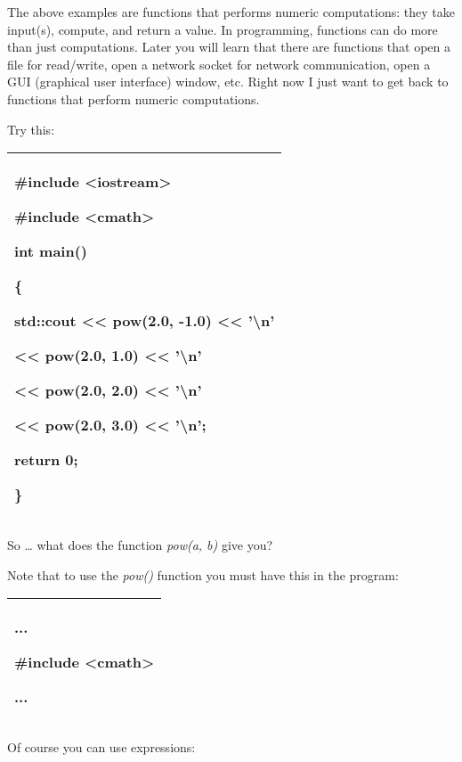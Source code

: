 \documentclass[
]{article}
\begin{document}
The above examples are functions that performs numeric computations:
they take input(s), compute, and return a value. In programming,
functions can do more than just computations. Later you will learn that
there are functions that open a file for read/write, open a network
socket for network communication, open a GUI (graphical user interface)
window, etc. Right now I just want to get back to functions that perform
numeric computations.

Try this:

\begin{longtable}[]{@{}l@{}}
\toprule
\endhead
\begin{minipage}[t]{0.97\columnwidth}\raggedright
\#include \textless iostream\textgreater{}

\#include \textless cmath\textgreater{}

int main()

\{

std::cout \textless\textless{} pow(2.0, -1.0) \textless\textless{}
'\textbackslash n'

\textless\textless{} pow(2.0, 1.0) \textless\textless{}
'\textbackslash n'

\textless\textless{} pow(2.0, 2.0) \textless\textless{}
'\textbackslash n'

\textless\textless{} pow(2.0, 3.0) \textless\textless{}
'\textbackslash n';

return 0;

\}\strut
\end{minipage}\tabularnewline
\bottomrule
\end{longtable}

So \ldots{} what does the function \emph{pow(a, b)} give you?

Note that to use the \emph{pow()} function you must have this in the
program:

\begin{longtable}[]{@{}l@{}}
\toprule
\endhead
\begin{minipage}[t]{0.97\columnwidth}\raggedright
...

\#include \textless cmath\textgreater{}

...\strut
\end{minipage}\tabularnewline
\bottomrule
\end{longtable}

Of course you can use expressions:
\end{document}
